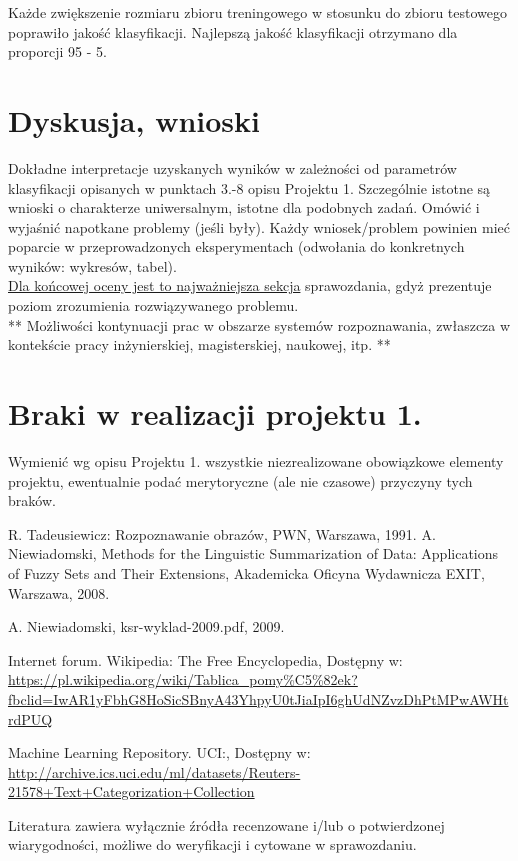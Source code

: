 \documentclass{classrep}
\begin{document}
Każde zwiększenie rozmiaru zbioru treningowego w stosunku do zbioru testowego poprawiło jakość klasyfikacji. Najlepszą jakość klasyfikacji otrzymano dla proporcji 95 - 5.\\


\section{Dyskusja, wnioski}

Dokładne interpretacje uzyskanych wyników w zależności od parametrów klasyfikacji
opisanych w punktach 3.-8 opisu Projektu 1. 
Szczególnie istotne są wnioski o charakterze uniwersalnym, istotne dla podobnych zadań. 
Omówić i wyjaśnić napotkane problemy (jeśli były). Każdy wniosek/problem powinien mieć poparcie
w przeprowadzonych eksperymentach (odwołania do konkretnych wyników: wykresów,
tabel). \\
\underline{Dla końcowej oceny jest to najważniejsza sekcja} sprawozdania, gdyż prezentuje poziom
zrozumienia rozwiązywanego problemu.\\

** Możliwości kontynuacji prac w obszarze systemów rozpoznawania, zwłaszcza w kontekście pracy inżynierskiej,
magisterskiej, naukowej, itp. **\\



\section{Braki w realizacji projektu 1.}
Wymienić wg opisu Projektu 1. wszystkie niezrealizowane obowiązkowe elementy projektu, ewentualnie
podać merytoryczne (ale nie czasowe) przyczyny tych braków. 


\begin{thebibliography}{0}
 R. Tadeusiewicz: Rozpoznawanie obrazów, PWN, Warszawa, 1991.  
 A. Niewiadomski, Methods for the Linguistic Summarization of Data: Applications of Fuzzy Sets and Their Extensions, Akademicka Oficyna Wydawnicza EXIT, Warszawa, 2008.

 A. Niewiadomski, ksr-wyklad-2009.pdf, 2009.

 Internet forum. Wikipedia: The Free Encyclopedia, Dostępny w: \url{https://pl.wikipedia.org/wiki/Tablica_pomy%C5%82ek?fbclid=IwAR1yFbhG8HoSicSBnyA43YhpyU0tJiaIpI6ghUdNZvzDhPtMPwAWHtrdPUQ}

 Machine Learning Repository. UCI:, Dostępny w: \url{http://archive.ics.uci.edu/ml/datasets/Reuters-21578+Text+Categorization+Collection}

\end{thebibliography}

Literatura zawiera wyłącznie źródła recenzowane i/lub o potwierdzonej wiarygodności,
możliwe do weryfikacji i cytowane w sprawozdaniu. 
\end{document}
